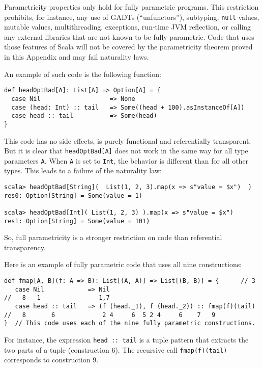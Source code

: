 Parametricity properties only hold for fully parametric programs.
This restriction prohibits, for instance, any use of GADTs
(\textsf{``}unfunctors\textsf{''}), subtyping,
\lstinline!null! values, mutable values, multithreading, exceptions,
run-time JVM reflection, or calling any external libraries that are
not known to be fully parametric. Code that uses those features of
Scala will not be covered by the parametricity theorem proved in this
Appendix and may fail naturality laws. 

An example of such code is the following function:
\begin{lstlisting}
def headOptBad[A]: List[A] => Option[A] = {
  case Nil                   => None
  case (head: Int) :: tail   => Some((head + 100).asInstanceOf[A])
  case head :: tail          => Some(head)
}
\end{lstlisting}
This code has no side effects, is purely functional and referentially
transparent. But it is clear that \lstinline!headOptBad[A]! does
not work in the same way for all type parameters \lstinline!A!. When
\lstinline!A! is set to \lstinline!Int!, the behavior is different
than for all other types. This leads to a failure of the naturality
law:
\begin{lstlisting}
scala> headOptBad[String](  List(1, 2, 3).map(x => s"value = $x")  )
res0: Option[String] = Some(value = 1)

scala> headOptBad[Int]( List(1, 2, 3) ).map(x => s"value = $x")
res1: Option[String] = Some(value = 101)
\end{lstlisting}
So, full parametricity is a stronger restriction on code than referential
transparency.

Here is an example of fully parametric code that uses all nine constructions:
\begin{lstlisting}
def fmap[A, B](f: A => B): List[(A, A)] => List[(B, B)] = {      // 3
   case Nil            => Nil
//   8   1                1,7 
   case head :: tail   => (f (head._1), f (head._2)) :: fmap(f)(tail)
//   8       6             2 4     6  5 2 4     6    7   9
}  // This code uses each of the nine fully parametric constructions.
\end{lstlisting}
For instance, the expression \lstinline!head :: tail! is a tuple
pattern that extracts the two parts of a tuple (construction 6). The
recursive call \lstinline!fmap(f)(tail)! corresponds to construction
9.

